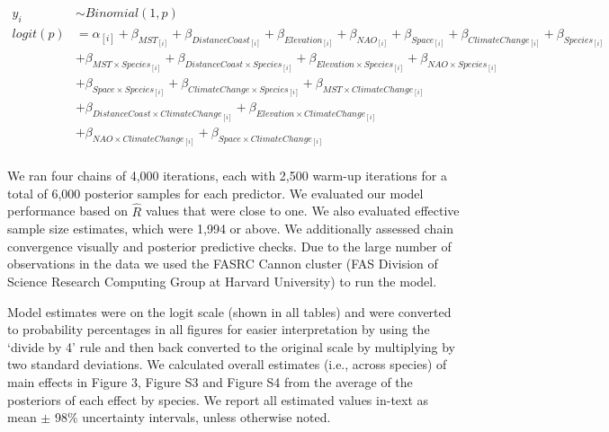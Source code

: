 \documentclass{article}\usepackage[]{graphicx}\usepackage[]{color}
\begin{document}
\begin{align*}
 y_i & \sim Binomial(1,p) \tag{2} \\
logit(p) &= \alpha_{[i]} + \beta_{MST_{[i]}} + \beta_{DistanceCoast_{[i]}} + \beta_{Elevation_{[i]}} + \beta_{NAO_{[i]}} + \beta_{Space_{[i]}} + \beta_{ClimateChange_{[i]}} + \beta_{Species_{[i]}} \\ 
  &+ \beta_{MST \times Species_{[i]}} + \beta_{DistanceCoast \times Species_{[i]}} + \beta_{Elevation \times Species_{[i]}} + \beta_{NAO \times Species_{[i]}}\\
  &+ \beta_{Space \times Species_{[i]}} + \beta_{ClimateChange \times Species_{[i]}} + \beta_{MST \times ClimateChange_{[i]}}\\ 
  &+ \beta_{DistanceCoast \times ClimateChange_{[i]}} + \beta_{Elevation \times ClimateChange_{[i]}}\\ 
  &+ \beta_{NAO \times ClimateChange_{[i]}} + \beta_{Space \times ClimateChange_{[i]}} \nonumber\\
\end{align*}

We ran four chains of 4,000 iterations, each with 2,500 warm-up iterations for a total of 6,000 posterior samples for each predictor. We evaluated our model performance based on $\hat{R}$ values that were close to one. We also evaluated effective sample size estimates, which were 1,994 or above. We additionally assessed chain convergence visually and posterior predictive checks. Due to the large number of observations in the data we used the FASRC Cannon cluster (FAS Division of Science Research Computing Group at Harvard University) to run the model. %

Model estimates were on the logit scale (shown in all tables) and were converted to probability percentages in all figures for easier interpretation by using the `divide by 4' rule \citep{Gelman2006} and then back converted to the original scale by multiplying by two standard deviations. We calculated overall estimates (i.e., across species) of main effects in Figure 3, Figure S3 and Figure S4 from the average of the posteriors of each effect by species. We report all estimated values in-text as mean $\pm$ 98\% uncertainty intervals, unless otherwise noted. %
\end{document}

